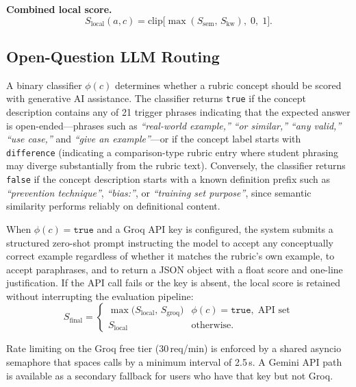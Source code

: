 \documentclass[conference]{IEEEtran}
\begin{document}
\textbf{Combined local score.}
\begin{equation}
  S_{\mathrm{local}}(a,c)=
  \mathrm{clip}\bigl[
    \max(S_{\mathrm{sem}},\,S_{\mathrm{kw}}),\;0,\;1
  \bigr].
  \label{eq:slocal}
\end{equation}

\subsection{Open-Question LLM Routing}

A binary classifier $\phi(c)$ determines whether a rubric concept
should be scored with generative AI assistance. The classifier
returns \texttt{true} if the concept description contains any of
21 trigger phrases indicating that the expected answer is
open-ended---phrases such as \textit{``real-world example,''}
\textit{``or similar,''} \textit{``any valid,''} \textit{``use
case,''} and \textit{``give an example''}---or if the concept
label starts with \texttt{difference} (indicating a
comparison-type rubric entry where student phrasing may diverge
substantially from the rubric text). Conversely, the classifier
returns \texttt{false} if the concept description starts with a
known definition prefix such as \textit{``prevention technique''},
\textit{``bias:''}, or \textit{``training set purpose''}, since
semantic similarity performs reliably on definitional content.

When $\phi(c) = \texttt{true}$ and a Groq API key is configured,
the system submits a structured zero-shot prompt instructing the
model to accept any conceptually correct example regardless of
whether it matches the rubric's own example, to accept
paraphrases, and to return a JSON object with a float score and
one-line justification. If the API call fails or the key is absent,
the local score is retained without interrupting the evaluation
pipeline:
\begin{equation}
  S_{\mathrm{final}}=
  \begin{cases}
    \max\!\bigl(S_{\mathrm{local}},\,S_{\mathrm{groq}}\bigr)
      & \phi(c)=\texttt{true},\;\text{API set}\\[2pt]
    S_{\mathrm{local}}
      & \text{otherwise.}
  \end{cases}
  \label{eq:sfinal}
\end{equation}

Rate limiting on the Groq free tier (30\,req/min) is enforced by a
shared asyncio semaphore that spaces calls by a minimum interval
of 2.5\,s. A Gemini API path is available as a secondary fallback
for users who have that key but not Groq.
\end{document}
